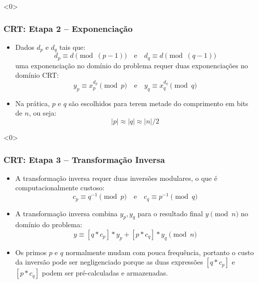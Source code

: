 \documentclass{beamer}
\begin{document}
\begin{frame}<0>
\frametitle{CRT: Etapa 2 – Exponenciação}

\begin{itemize}
    \item Dados $d_p$ e $d_q$ tais que:
    \[ d_p \equiv d \pmod{(p-1)} \quad \text{e} \quad d_q \equiv d \pmod{(q-1)} \]
    uma exponenciação no domínio do problema requer duas exponenciações no domínio CRT:
    \[ y_p \equiv x_p^{d_p} \pmod p \quad \text{e} \quad y_q \equiv x_q^{d_q} \pmod q \]
    \vspace{0.3cm} %
    \vspace{0.5em}
    \item Na prática, $p$ e $q$ são escolhidos para terem metade do comprimento em bits de $n$, ou seja:
    \[ |p| \approx |q| \approx |n|/2 \]
\end{itemize}

\end{frame}

\begin{frame}<0>
\frametitle{CRT: Etapa 3 – Transformação Inversa}

\begin{itemize}
    \item A transformação inversa requer duas inversões modulares, o que é computacionalmente custoso:
    \[ c_p \equiv q^{-1} \pmod p \quad \text{e} \quad c_q \equiv p^{-1} \pmod q \]
    
    \item A transformação inversa combina $y_p, y_q$ para o resultado final $y \pmod n$ no domínio do problema:
    \[ y \equiv [q * c_p] * y_p + [p * c_q] * y_q \pmod n \]
    
    \item Os primos $p$ e $q$ normalmente mudam com pouca frequência, portanto o custo da inversão pode ser negligenciado porque as duas expressões $[q * c_p]$ e $[p * c_q]$ podem ser pré-calculadas e armazenadas.
\end{itemize}

\end{frame}
\end{document}
